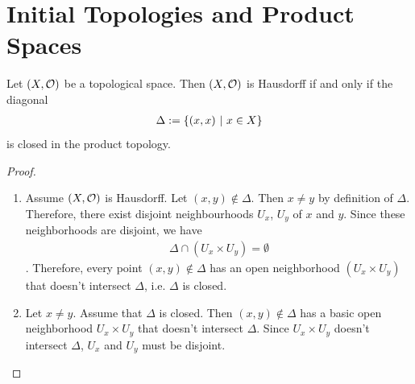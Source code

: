 \section{Initial Topologies and Product Spaces}
\begin{lemma}
	Let $(X, \mathcal{O})$ be a topological space. Then $(X, \mathcal{O})$ is Hausdorff if and only if the diagonal
	\begin{align*}
		\Delta := \qty{(x,x) ~\middle|~x \in X}
	\end{align*}
	is closed in the product topology.
\end{lemma}
\begin{proof}
	\begin{enumerate}
		\item[$\Rightarrow$] Assume $(X, \mathcal{O})$ is Hausdorff. Let $(x,y) \notin \Delta$. Then $x \neq y$ by definition of $\Delta$. Therefore, there exist disjoint neighbourhoods $U_x$, $U_y$ of $x$ and $y$. Since these neighborhoods are disjoint, we have
		\begin{align*}
			\Delta \cap (U_x \times U_y) = \emptyset
		\end{align*}. Therefore, every point $(x,y) \notin \Delta$ has an open neighborhood $(U_x \times U_y)$ that doesn't intersect $\Delta$, i.e. $\Delta$ is closed.
		\item[$\Leftarrow$] Let $x \neq y$. Assume that $\Delta$ is closed. Then $(x,y) \notin \Delta$ has a basic open neighborhood $U_x \times U_y$ that doesn't intersect $\Delta$. Since $U_x \times U_y$ doesn't intersect $\Delta$, $U_x$ and $U_y$ must be disjoint.
	\end{enumerate}
\end{proof}

\clearpage

